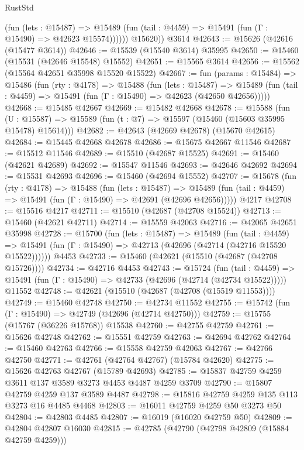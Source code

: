 \begin{lexlean}{RustStd}
\begin{coremodule}
              (fun (lets : @15487) =>
              @15489 (fun (tail : @4459) => @15491 (fun (Γ : @15490) => @42623 @15574))))))
        @15620))
    @3614
@42643 := @15626 (@42616 (@15477 @3614))
@42646 := @15539 (@15540 @3614) @35995
@42650 := @15460 (@15531 (@42646 @15548) @15552)
@42651 := @15565 @3614
@42656 := @15562 (@15564 @42651 @35998 @15520 @15522)
@42667 := fun (params : @15484) =>
  @15486
    (fun (rty : @4178) =>
    @15488
      (fun (lets : @15487) =>
      @15489 (fun (tail : @4459) => @15491 (fun (Γ : @15490) => @42623 (@42650 @42656)))))
@42668 := @15485 @42667
@42669 := @15482 @42668
@42678 := @15588
    (fun (U : @15587) => @15589 (fun (t : @7) => @15597 (@15460 (@15603 @35995 @15478) @15614)))
@42682 := @42643 (@42669 @42678) (@15670 @42615)
@42684 := @15445 @42668 @42678
@42686 := @15675 @42667 @11546
@42687 := @15512 @11546
@42689 := @15510 (@42687 @15525)
@42691 := @15460 (@42621 @42689)
@42692 := @15547 @11546
@42693 := @42646 @42692
@42694 := @15531 @42693
@42696 := @15460 (@42694 @15552)
@42707 := @15678
    (fun (rty : @4178) =>
    @15488
      (fun (lets : @15487) =>
      @15489 (fun (tail : @4459) => @15491 (fun (Γ : @15490) => @42691 (@42696 @42656)))))
    @4217
@42708 := @15516 @4217
@42711 := @15510 (@42687 (@42708 @15524))
@42713 := @15460 (@42621 @42711)
@42714 := @15559 @42063
@42716 := @42065 @42651 @35998
@42728 := @15700
    (fun (lets : @15487) =>
    @15489
      (fun (tail : @4459) =>
      @15491 (fun (Γ : @15490) => @42713 (@42696 (@42714 (@42716 @15520 @15522))))))
    @4453
@42733 := @15460 (@42621 (@15510 (@42687 (@42708 @15726))))
@42734 := @42716 @4453
@42743 := @15724
    (fun (tail : @4459) => @15491 (fun (Γ : @15490) => @42733 (@42696 (@42714 (@42734 @15522)))))
    @11552
@42748 := @42621 (@15510 (@42687 (@42708 (@15519 @11553))))
@42749 := @15460 @42748
@42750 := @42734 @11552
@42755 := @15742 (fun (Γ : @15490) => @42749 (@42696 (@42714 @42750)))
@42759 := @15755 (@15767 (@36226 @15768)) @15538
@42760 := @42755 @42759
@42761 := @15626 @42748
@42762 := @15551 @42759
@42763 := @42694 @42762
@42764 := @15460 @42763
@42766 := @15558 @42759 @42063
@42767 := @42766 @42750
@42771 := @42761 (@42764 @42767) (@15784 @42620)
@42775 := @15626 @42763 @42767 (@15789 @42693)
@42785 := @15837 @42759 @4259 @3611 @137 @3589 @3273 @4453 @4487 @4259 @3709
@42790 := @15807 @42759 @4259 @137 @3589 @4487
@42798 := @15816 @42759 @4259 @135 @113 @3273 @16 @4485 @4468
@42803 := @16011 @42759 @4259 @50 @3273 @50
@42804 := @42803 @4485
@42807 := @16019 (@16020 @42759 @50)
@42809 := @42804 @42807 @16030
@42815 := @42785 (@42790 (@42798 @42809 (@15884 @42759 @4259)))

\end{coremodule}
\end{lexlean}
